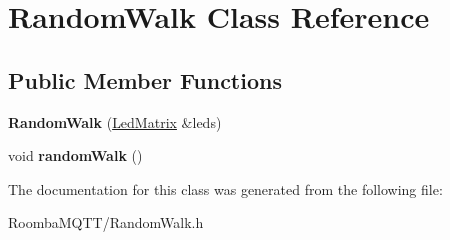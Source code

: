 \hypertarget{class_random_walk}{}\section{Random\+Walk Class Reference}
\label{class_random_walk}
\subsection*{Public Member Functions}
\begin{DoxyCompactItemize}
\item 
\mbox{\label{class_random_walk_aeb88c4057ad738c0d5238ed8278daea9}} 
{\bfseries Random\+Walk} (\mbox{\hyperlink{class_led_matrix}{Led\+Matrix}} \&leds)
\item 
\mbox{\label{class_random_walk_a90d75ccc484629a8e631c6da39a998b9}} 
void {\bfseries random\+Walk} ()
\end{DoxyCompactItemize}


The documentation for this class was generated from the following file\+:\begin{DoxyCompactItemize}
\item 
Roomba\+M\+Q\+T\+T/Random\+Walk.\+h\end{DoxyCompactItemize}
